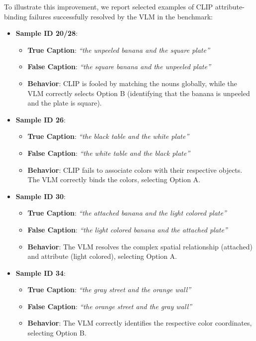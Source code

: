 \documentclass[11pt,a4paper]{article}
\begin{document}
To illustrate this improvement, we report selected examples of CLIP attribute-binding failures successfully resolved by the VLM in the benchmark:
\begin{itemize}
    \item \textbf{Sample ID 20/28}: 
    \begin{itemize}
        \item \textbf{True Caption}: \textit{``the unpeeled banana and the square plate''}
        \item \textbf{False Caption}: \textit{``the square banana and the unpeeled plate''}
        \item \textbf{Behavior}: CLIP is fooled by matching the nouns globally, while the VLM correctly selects Option B (identifying that the banana is unpeeled and the plate is square).
    \end{itemize}
    
    \item \textbf{Sample ID 26}: 
    \begin{itemize}
        \item \textbf{True Caption}: \textit{``the black table and the white plate''}
        \item \textbf{False Caption}: \textit{``the white table and the black plate''}
        \item \textbf{Behavior}: CLIP fails to associate colors with their respective objects. The VLM correctly binds the colors, selecting Option A.
    \end{itemize}
    
    \item \textbf{Sample ID 30}: 
    \begin{itemize}
        \item \textbf{True Caption}: \textit{``the attached banana and the light colored plate''}
        \item \textbf{False Caption}: \textit{``the light colored banana and the attached plate''}
        \item \textbf{Behavior}: The VLM resolves the complex spatial relationship (attached) and attribute (light colored), selecting Option A.
    \end{itemize}
    
    \item \textbf{Sample ID 34}: 
    \begin{itemize}
        \item \textbf{True Caption}: \textit{``the gray street and the orange wall''}
        \item \textbf{False Caption}: \textit{``the orange street and the gray wall''}
        \item \textbf{Behavior}: The VLM correctly identifies the respective color coordinates, selecting Option B.
    \end{itemize}
\end{itemize}
\end{document}
